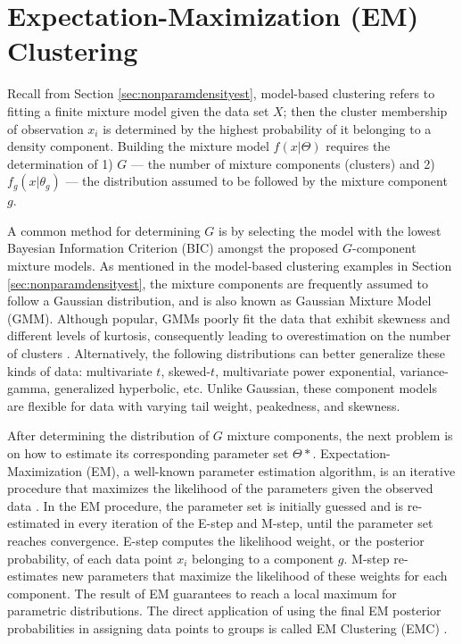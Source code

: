 \section{Expectation-Maximization (EM) Clustering}
\label{sec:emclustering}

Recall from Section \ref{sec:nonparamdensityest}, model-based clustering refers to fitting a finite mixture model given the data set \(X\); then the cluster membership of observation \(x_i\) is determined by the highest probability of it belonging to a density component. Building the mixture model \(f(x|\Theta)\) requires the determination of 1) \(G\) — the number of mixture components (clusters) and 2) \(f_g(x|\theta_g)\) — the distribution assumed to be followed by the mixture component \(g\). 

A common method for determining \(G\) is by selecting the model with the lowest Bayesian Information Criterion (BIC) amongst the proposed \(G\)-component mixture models. As mentioned in the model-based clustering examples in Section \ref{sec:nonparamdensityest}, the mixture components are frequently assumed to follow a Gaussian distribution, and is also known as Gaussian Mixture Model (GMM). Although popular, GMMs poorly fit the data that exhibit skewness and different levels of kurtosis, consequently leading to overestimation on the number of clusters \cite{Dang2019}. Alternatively, the following distributions can better generalize these kinds of data: multivariate \(t\), skewed-\(t\), multivariate power exponential, variance-gamma, generalized hyperbolic, etc. Unlike Gaussian, these component models are flexible for data with varying tail weight, peakedness, and skewness.

After determining the distribution of \(G\) mixture components, the next problem is on how to estimate its corresponding parameter set \(\Theta*\). Expectation-Maximization (EM), a well-known parameter estimation algorithm, is an iterative procedure that maximizes the likelihood of the parameters given the observed data \cite{Garriga2016}. In the EM procedure, the parameter set is initially guessed and is re-estimated in every iteration of the E-step and M-step, until the parameter set reaches convergence. E-step computes the likelihood weight, or the posterior probability, of each data point \(x_i\) belonging to a component \(g\). M-step re-estimates new parameters that maximize the likelihood of these weights for each component. The result of EM guarantees to reach a local maximum for parametric distributions. The direct application of using the final EM posterior probabilities in assigning data points to groups is called EM Clustering (EMC) \cite{Garriga2016}. 

